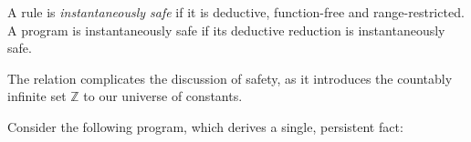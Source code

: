 \begin{definition}
%
A rule is \emph{instantaneously safe} if it is deductive,  function-free and range-restricted.
A \slang program is instantaneously safe if its deductive reduction is instantaneously safe.
%
\end{definition}


The  relation complicates the discussion of safety, as it
introduces the countably infinite set $\mathbb{Z}$ to our
universe of constants.

Consider the following \slang program, which derives a single, persistent fact:







